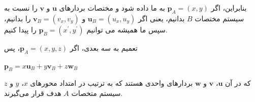 {\begin{spacing}{1.5}
        بنابراین، اگر $\textbf{p}_{A}=(x, y)$ به ما داده شود و مختصات بردارهای $\textbf{u}$ و $\textbf{v}$ را نسبت به سیستم مختصات $B$ بدانیم،
        یعنی اگر $\textbf{u}_{B}=(u_{x}, u_{y})$ و $\textbf{v}_{B}=(v_{x}, v_{y})$ را بدانیم، سپس ما همیشه می توانیم $\textbf{p}_{B}=(x^\prime, y^\prime)$ را پیدا کنیم.

        تعمیم به سه بعدی، اگر $\textbf{p}_{A}=(x, y, z)$، پس

        \begin{center}
            $\textbf{p}_{B}=x\textbf{u}_{B}+y\textbf{v}_{B}+z\textbf{w}_{B}$
        \end{center}

        که در آن $\textbf{u}$، $\textbf{v}$ و $\textbf{w}$ بردارهای واحدی هستند که به ترتیب در امتداد محورهای $x$، $y$ و $z$ سیستم متخصات $A$ هدف قرار می‌گیرند.
    \end{spacing}
}

